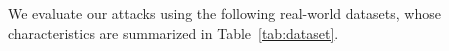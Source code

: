 \documentclass[bachelor]{thesis-uestc}
\begin{document}



We evaluate our attacks using the following real-world datasets, whose
characteristics are summarized in Table~\ref{tab:dataset}. 
\end{document}
